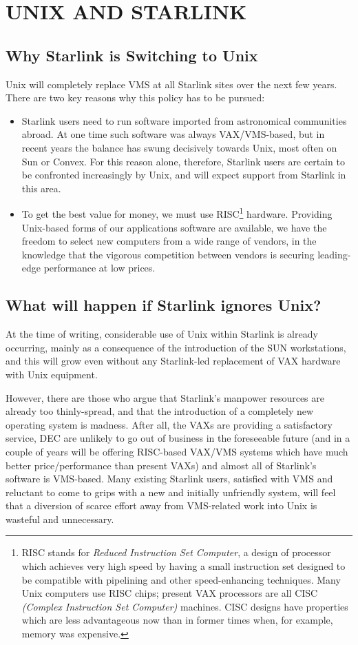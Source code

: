 \section{UNIX AND STARLINK}
\subsection{Why Starlink is Switching to Unix}
Unix will completely replace VMS at all Starlink sites over the next
few years.  There are two key reasons why this policy has to be pursued:
\begin{itemize}
\item Starlink users need to run software imported from astronomical
communities abroad.  At one time such software was always VAX/VMS-based,
but in recent years the balance has swung decisively towards Unix, most
often on Sun or Convex.  For this reason alone, therefore, Starlink
users are certain to be confronted increasingly by Unix, and will expect
support from Starlink in this area.
\item To get the best value for money, we must use RISC\footnote{RISC
stands for {\it Reduced Instruction Set Computer}, a design of processor
which achieves very high speed by having a small instruction set
designed to be compatible with pipelining and other speed-enhancing
techniques.  Many Unix computers use RISC chips;  present VAX processors
are all CISC {\it (Complex Instruction Set Computer)} machines.  CISC
designs have properties which are less advantageous now than in former
times when, for example, memory was expensive.} hardware.  Providing
Unix-based forms of our applications software are available, we have the
freedom to select new computers from a wide range of vendors, in the
knowledge that the vigorous competition between vendors is securing
leading-edge performance at low prices.
\end{itemize}

\subsection{What will happen if Starlink ignores Unix?}
At the time of writing, considerable use of Unix within Starlink is
already occurring, mainly as a consequence of the introduction of the
SUN workstations, and this will grow even without any Starlink-led
replacement of VAX hardware with Unix equipment.

However, there are those who argue that Starlink's manpower resources
are already too thinly-spread, and that the introduction of a completely
new operating system is madness.  After all, the VAXs are providing a
satisfactory service, DEC are unlikely to go out of business in the
foreseeable future (and in a couple of years will be offering RISC-based
VAX/VMS systems which have much better price/performance than present
VAXs) and almost all of Starlink's software is VMS-based.  Many existing
Starlink users, satisfied with VMS and reluctant to come to grips with a
new and initially unfriendly system, will feel that a diversion of
scarce effort away from VMS-related work into Unix is wasteful and
unnecessary.


